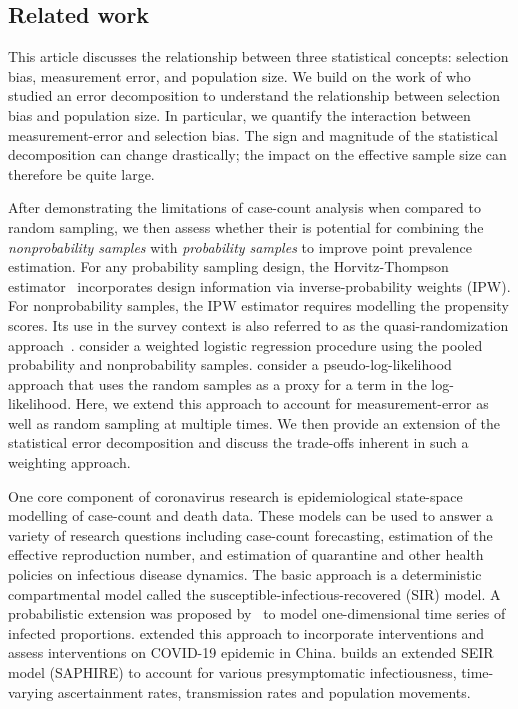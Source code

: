 \documentclass[11pt]{amsart}
\numberwithin{equation}{section}
\theoremstyle{plain}
\begin{document}
\subsection{Related work}

This article discusses the relationship between three statistical concepts: selection bias, measurement error, and population size.  We build on the work of \cite{Meng2018} who studied an error decomposition to understand the relationship between selection bias and population size.  In particular, we quantify the interaction between measurement-error and selection bias.  The sign and magnitude of the statistical decomposition can change drastically; the impact on the effective sample size can therefore be quite large.

After demonstrating the limitations of case-count analysis when compared to random sampling, we then assess whether their is potential for combining the \emph{nonprobability samples} with \emph{probability samples} to improve point prevalence estimation. For any probability sampling design, the Horvitz-Thompson estimator~\citep{HT1952} incorporates design information via inverse-probability weights (IPW).  For nonprobability samples, the IPW estimator requires modelling the propensity scores.  Its use in the survey context is also referred to as the quasi-randomization approach~\citep{Elliott2017}. \cite{Valliant2011} consider a weighted logistic regression procedure using the pooled probability and nonprobability samples.  \cite{Chen2019} consider a pseudo-log-likelihood approach that uses the random samples as a proxy for a term in the log-likelihood.  Here, we extend this approach to account for measurement-error as well as random sampling at multiple times. We then provide an extension of the statistical error decomposition and discuss the trade-offs inherent in such a weighting approach.

One core component of coronavirus research is epidemiological state-space modelling of case-count and death data. These models can be used to answer a variety of research questions including case-count forecasting, estimation of the effective reproduction number, and estimation of quarantine and other health policies on infectious disease dynamics.  The basic approach is a deterministic compartmental model called the susceptible-infectious-recovered (SIR) model.  A probabilistic extension was proposed by~\cite{Osthus2017} to model one-dimensional time series of infected proportions. \cite{Song2020} extended this approach to incorporate interventions and assess interventions on COVID-19 epidemic in China. \cite{Hao2020} builds an extended SEIR model (SAPHIRE) to account for various presymptomatic infectiousness, time-varying ascertainment rates, transmission rates and population movements.
\end{document}
